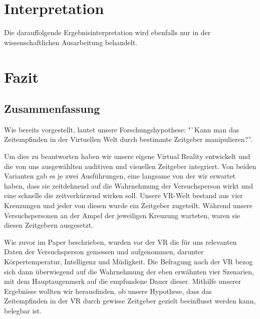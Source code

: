 \documentclass{Bericht}
\begin{document}
\section{Interpretation} %
	Die darauffolgende Ergebnisinterpretation wird ebenfalls nur in der wissenschaftlichen Ausarbeitung behandelt.
	
\section{Fazit} %
\subsection{Zusammenfassung}
Wie bereits vorgestellt, lautet unsere Forschungshypothese: "`Kann man das Zeitempfinden in der Virtuellen Welt durch bestimmte Zeitgeber manipulieren?''.

Um dies zu beantworten haben wir unsere eigene Virtual Reality entwickelt und die von uns ausgewählten auditiven und visuellen Zeitgeber integriert. Von beiden Varianten gab es je zwei Ausführungen, eine langsame von der wir erwartet haben, dass sie zeitdehnend auf die Wahrnehmung der Versuchsperson wirkt und eine schnelle die zeitverkürzend wirken soll. Unsere VR-Welt bestand aus vier Kreuzungen und jeder von diesen wurde ein Zeitgeber zugeteilt. Während unsere Versuchspersonen an der Ampel der jeweiligen Kreuzung warteten, waren sie diesen Zeitgebern ausgesetzt. 

Wie zuvor im Paper beschrieben, wurden vor der VR  die für uns relevanten Daten der Versuchsperson gemessen und aufgenommen, darunter Körpertemperatur, Intelligenz und Müdigkeit. Die Befragung nach der VR bezog sich dann überwiegend auf die Wahrnehmung der eben erwähnten vier Szenarien, mit dem Hauptaugenmerk auf die empfundene Dauer dieser. Mithilfe unserer Ergebnisse wollten wir herausfinden, ob unsere Hypothese, dass das Zeitempfinden in der VR durch gewisse Zeitgeber gezielt beeinflusst werden kann, belegbar ist.
\end{document}
